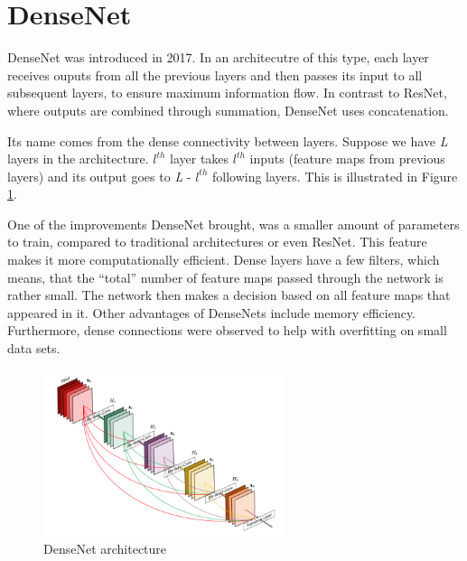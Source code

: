 \section{DenseNet}
DenseNet \cite{densenet2017} was introduced in 2017. In an architecutre of this type, each layer receives ouputs from all the previous layers and then passes its input to all subsequent layers, to ensure maximum information flow.  In contrast to ResNet, where outputs are combined through summation, DenseNet uses concatenation.

Its name comes from the dense connectivity between layers. Suppose we have \textit{L} layers in the architecture. \textit{$l^{th}$} layer takes \textit{$l^{th}$} inputs (feature maps from previous layers) and its output goes to \textit{L} - \textit{$l^{th}$} following layers. This is illustrated in Figure \ref{fig:densenet}.

One of the improvements DenseNet brought, was a smaller amount of parameters to train, compared to traditional architectures or even ResNet. This feature makes it more computationally efficient. Dense layers have a few filters, which means, that the ``total'' number of feature maps passed through the network is rather small. The network then makes a decision based on all feature maps that appeared in it. Other advantages of DenseNets include memory efficiency. Furthermore, dense connections were observed to help with overfitting on small data sets.


\begin{figure}[ht!]
    \centering
    \includegraphics[width=200pt]{images/densenet.png}
    \caption[DenseNet architecture]{DenseNet architecture \cite{densenet2017}}
    \label{fig:densenet}
\end{figure}

\pagebreak